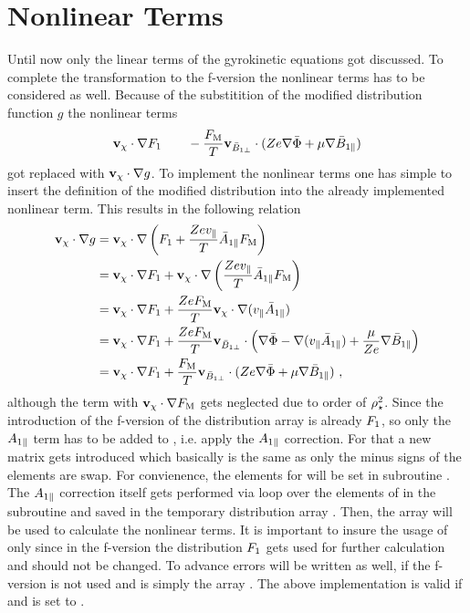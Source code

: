 \section{Nonlinear Terms}
\label{sec:implementationNonlinearTerms}

Until now only the linear terms of the gyrokinetic equations got discussed. To complete the transformation to the f-version {\gkw} the nonlinear terms has to be considered as well. Because of the substitition of the modified distribution function $g$ the nonlinear terms 
\begin{gather*}
    \boldsymbol{\mathbf{v}}_\chi \cdot \nabla F_1 \qquad -\frac{F_\mathrm{M}}{T} \boldsymbol{\mathbf{v}}_{\bar{B}_{1\perp}} \cdot (Z e \nabla \bar{\Phi} + \mu \nabla \bar{B}_{1\parallel})
    \label{eq:nonlinearTermsFVersion}
\end{gather*}
got replaced with $\boldsymbol{\mathbf{v}}_\chi \cdot \nabla g$. To implement the nonlinear terms one has simple to insert the definition of the modified distribution into the already implemented nonlinear term. This results in the following relation
\begin{gather}
    \begin{aligned}
        \boldsymbol{\mathbf{v}}_\chi \cdot \nabla g &= \boldsymbol{\mathbf{v}}_\chi \cdot \nabla \left(F_1 + \frac{Ze v_\parallel}{T} \bar{A}_{1\parallel} F_\mathrm{M}\right) \\
                             &= \boldsymbol{\mathbf{v}}_\chi \cdot \nabla F_1 + \boldsymbol{\mathbf{v}}_\chi \cdot \nabla \left(\frac{Ze v_\parallel}{T} \bar{A}_{1\parallel} F_\mathrm{M} \right) \\
                             &= \boldsymbol{\mathbf{v}}_\chi \cdot \nabla F_1 + \frac{Ze F_\mathrm{M}}{T} \boldsymbol{\mathbf{v}}_\chi \cdot \nabla (v_\parallel\bar{A}_{1\parallel}) \\
                             &= \boldsymbol{\mathbf{v}}_\chi \cdot \nabla F_1 + \frac{Ze F_\mathrm{M}}{T} \boldsymbol{\mathbf{v}}_{\bar{B}_{1\perp}} \cdot \left( \nabla \bar{\Phi} - \nabla (v_\parallel \bar{A}_{1\parallel}) + \frac{\mu}{Ze} \nabla \bar{B}_{1\parallel} \right) \\
                             &= \boldsymbol{\mathbf{v}}_\chi \cdot \nabla F_1 + \frac{F_\mathrm{M}}{T} \boldsymbol{\mathbf{v}}_{\bar{B}_{1\perp}} \cdot ( Ze \nabla \bar{\Phi} + \mu \nabla \bar{B}_{1\parallel}) ~,
    \end{aligned}
    \label{eq:nonlinearTermsGVersionToFVersion}
\end{gather}
although the term with $\boldsymbol{\mathbf{v}}_\chi \cdot \nabla F_\mathrm{M}$ gets neglected due to order of $\rho_\star^2$. Since the introduction of the f-version of {\gkw} the distribution array  is already $F_1$, so only the $A_{1\parallel}$ term has to be added to , i.e. apply the $A_{1\parallel}$ correction. For that a new matrix  gets introduced which basically is the same as  only the minus signs of the elements are swap. For convienence, the elements for  will be set in subroutine . The $A_{1\parallel}$ correction itself gets performed via loop over the elements of  in the subroutine  and saved in the temporary distribution array . Then, the array  will be used to calculate the nonlinear terms. It is important to insure the usage of  only since in the f-version the distribution $F_1$ gets used for further calculation and should not be changed. To advance errors  will be written as well, if the f-version is not used and is simply the array . The above implementation is valid if  and  is set to .
